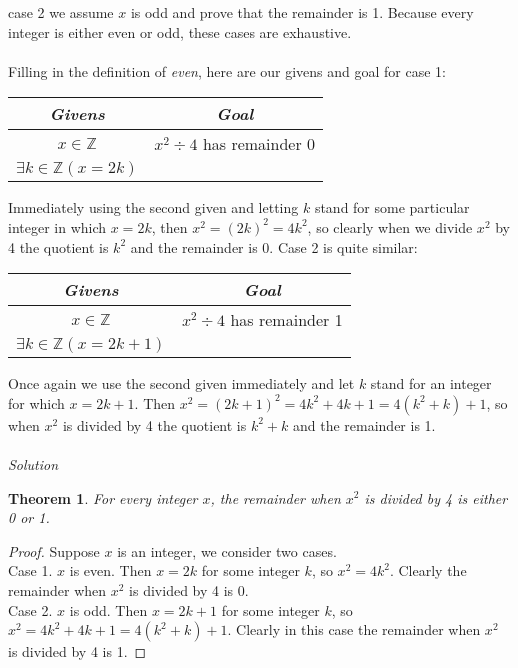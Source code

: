 \documentclass{report}
\newtheorem*{theorem}{Theorem}
\theoremstyle{definition}
\begin{document}
case 2 we assume $x$ is odd and prove that the remainder is 1. Because every integer is either even or odd, these cases are exhaustive.\\
\vspace{1mm}\\
Filling in the definition of \textit{even}, here are our givens and goal for case 1:
\begin{center}
\begin{tabular}{c|c}
\textit{Givens}&\textit{Goal}\\
\hline
$x\in\mathbb Z$&$x^2\div4$ has remainder 0\\
$\exists k\in\mathbb Z(x=2k)$&
\end{tabular}
\end{center}
Immediately using the second given and letting $k$ stand for some particular integer in which $x=2k$, then $x^2=(2k)^2=4k^2$, so clearly when we divide $x^2$ by 4 the quotient is $k^2$
and the remainder is 0. Case 2 is quite similar:
\begin{center}
\begin{tabular}{c|c}
\textit{Givens}&\textit{Goal}\\
\hline
$x\in\mathbb Z$&$x^2\div4$ has remainder 1\\
$\exists k\in\mathbb Z(x=2k+1)$&
\end{tabular}
\end{center}
Once again we use the second given immediately and let $k$ stand for an integer for which $x=2k+1$. Then $x^2=(2k+1)^2=4k^2+4k+1=4(k^2+k)+1$, so when
$x^2$ is divided by 4 the quotient is $k^2+k$ and the remainder is 1.\\
\vspace{1mm}\\
\textit{Solution}
\begin{theorem}
For every integer $x$, the remainder when $x^2$ is divided by 4 is either 0 or 1.
\end{theorem}
\begin{proof}
Suppose $x$ is an integer, we consider two cases.\\
\indent Case 1. $x$ is even. Then $x=2k$ for some integer $k$, so $x^2=4k^2$. Clearly the remainder when $x^2$ is divided by 4 is 0.\\
\indent Case 2. $x$ is odd. Then $x=2k+1$ for some integer $k$, so $x^2=4k^2+4k+1=4(k^2+k)+1$. Clearly in this case the remainder when $x^2$ is divided by 4 is 1.
\end{proof}
\newpage
\end{document}
